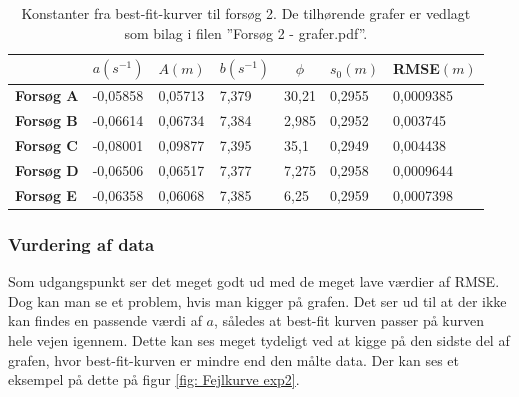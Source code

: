 \begin{table}[h]
\centering
\begin{tabular}{|l|l|l|l|l|l|l|}
\hline
\multicolumn{1}{|c|}{} & \multicolumn{1}{c|}{\textbf{$a(s^{-1})$}} & \multicolumn{1}{c|}{\textbf{$A(m)$}} & \multicolumn{1}{c|}{\textbf{$b(s^{-1})$}} & \multicolumn{1}{c|}{\textbf{$\phi$}} & \multicolumn{1}{c|}{\textbf{$s_0(m)$}} & \multicolumn{1}{c|}{\textbf{RMSE$(m)$}} \\ \hline
\textbf{Forsøg A}      & -0,05858                          & 0,05713                           & 7,379                             & 30,21                                & 0,2955                              & 0,0009385                          \\ \hline
\textbf{Forsøg B}      & -0,06614                          & 0,06734                           & 7,384                             & 2,985                                & 0,2952                              & 0,003745                           \\ \hline
\textbf{Forsøg C}      & -0,08001                          & 0,09877                           & 7,395                             & 35,1                                 & 0,2949                              & 0,004438                           \\ \hline
\textbf{Forsøg D}      & -0,06506                          & 0,06517                           & 7,377                             & 7,275                                & 0,2958                              & 0,0009644                          \\ \hline
\textbf{Forsøg E}      & -0,06358                          & 0,06068                           & 7,385                             & 6,25                                 & 0,2959                              & 0,0007398                          \\ \hline
\end{tabular}
\caption{Konstanter fra best-fit-kurver til forsøg 2. De tilhørende grafer er vedlagt som bilag i filen ''Forsøg 2 - grafer.pdf''.}
\label{tabel: best fit exp2}
\end{table}

\subsubsection{Vurdering af data}

Som udgangspunkt ser det meget godt ud med de meget lave værdier af RMSE. 
Dog kan man se et problem, hvis man kigger på grafen.
Det ser ud til at der ikke kan findes en passende værdi af $a$, således at best-fit kurven passer på kurven hele vejen igennem. 
Dette kan ses meget tydeligt ved at kigge på den sidste del af grafen, hvor best-fit-kurven er mindre end den målte data.
Der kan ses et eksempel på dette på figur \ref{fig: Fejlkurve exp2}.


